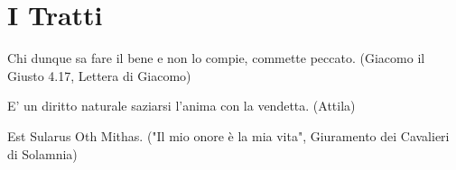 \section{I Tratti}\hypertarget{tratti}{}\label{tratti}

\begin{changemargin}{0.3cm}{0.3cm}\begin{enfasi}{Chi dunque sa fare il bene e non lo compie, commette peccato. (Giacomo il Giusto 4.17, Lettera di Giacomo)
\smallskip

E' un diritto naturale saziarsi l'anima con la vendetta. (Attila)
\smallskip

Est Sularus Oth Mithas. ("Il mio onore è la mia vita", Giuramento dei Cavalieri di Solamnia)
}\end{enfasi}\end{changemargin}

